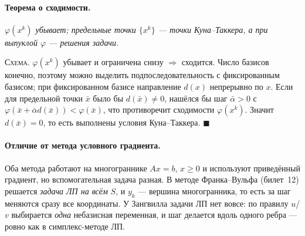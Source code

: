 \paragraph{Теорема о сходимости.}
\textit{$\varphi(x^k)$ убывает; предельные точки $\{x^k\}$ — точки
Куна--Таккера, а при выпуклой $\varphi$ — решения задачи.}

\textsc{Схема.} $\varphi(x^k)$ убывает и ограничена снизу $\Rightarrow$
сходится. Число базисов конечно, поэтому можно выделить подпоследовательность
с фиксированным базисом; при фиксированном базисе направление $d(x)$
непрерывно по $x$. Если для предельной точки $\bar{x}$ было бы
$d(\bar{x}) \ne 0$, нашёлся бы шаг $\bar\alpha > 0$ с
$\varphi(\bar{x} + \bar\alpha d(\bar{x})) < \varphi(\bar{x})$, что
противоречит сходимости $\varphi(x^k)$. Значит $d(\bar{x}) = 0$, то есть
выполнены условия Куна--Таккера. $\blacksquare$

\paragraph{Отличие от метода условного градиента.}
Оба метода работают на многограннике $Ax = b$, $x \ge 0$ и используют
приведённый градиент, но вспомогательная задача разная. В методе
Франка--Вульфа (билет~12) решается \emph{задача ЛП на всём} $S$, и $y_k$ —
вершина многогранника, то есть за шаг меняются сразу все координаты. У
Зангвилла задачи ЛП нет вовсе: по правилу $u$/$v$ выбирается \emph{одна}
небазисная переменная, и шаг делается вдоль одного ребра — ровно как в
симплекс-методе ЛП.

